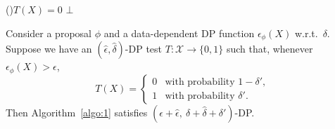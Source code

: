 \begin{algorithm}[t]
    \caption{Algorithm}\label{algo:1}
    \If(){$T(X)=0$}{
      \Return $\bot$
    }
\end{algorithm}
    
Consider a proposal $\phi$ and a data-dependent DP function $\epsilon_\phi(X)$ w.r.t.\ $\delta$.
Suppose we have an $(\hat{\epsilon},\hat{\delta})$-DP test
$T:\mathcal{X}\to\{0,1\}$ such that, whenever $\epsilon_\phi(X)>\epsilon$,
\[
T(X)=
\begin{cases}
0 & \text{with probability } 1-\delta',\\
1 & \text{with probability } \delta'.
\end{cases}
\]
Then Algorithm~\ref{algo:1} satisfies
$(\epsilon+\hat{\epsilon},\ \delta+\hat{\delta}+\delta')$-DP.
